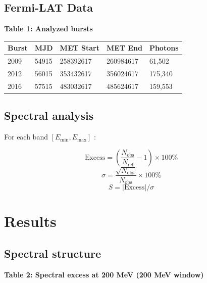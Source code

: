 \documentclass[11pt]{article}
\begin{document}
\hypertarget{fermi-lat-data}{%
\subsection{Fermi-LAT Data}\label{fermi-lat-data}}

\textbf{Table 1: Analyzed bursts}

\begin{longtable}[]{@{}lllll@{}}
\toprule
Burst & MJD & MET Start & MET End & Photons \\
\midrule
\endhead
2009 & 54915 & 258392617 & 260984617 & 61,502 \\
2012 & 56015 & 353432617 & 356024617 & 175,340 \\
2016 & 57515 & 483032617 & 485624617 & 159,553 \\
\bottomrule
\end{longtable}

\hypertarget{spectral-analysis}{%
\subsection{Spectral analysis}\label{spectral-analysis}}

For each band \([E_{\min}, E_{\max}]\) :

\[\text{Excess} = \left(\frac{N_{\text{obs}}}{N_{\text{ref}}} - 1\right) \times 100\%\]
\[\sigma = \frac{\sqrt{N_{\text{obs}}}}{N_{\text{obs}}} \times 100\%\]
\[S = |\text{Excess}| / \sigma\]

\hypertarget{results-1}{%
\section{Results}\label{results-1}}

\hypertarget{spectral-structure}{%
\subsection{Spectral structure}\label{spectral-structure}}

\textbf{Table 2: Spectral excess at 200 MeV (200 MeV window)}
\end{document}
